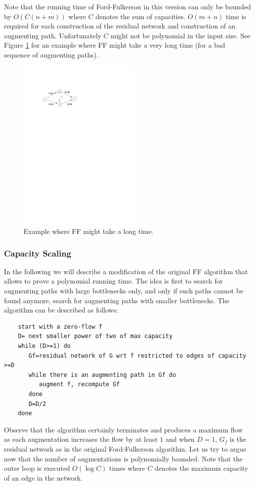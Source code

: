 \documentclass{article}
\begin{document}
Note that the running time of Ford-Fulkerson in this version can only be bounded by $O(C(n+m))$ where $C$ denotes the sum of capacities. $O(m+n)$ time is required for each construction of the residual network and construction of an augmenting path. Unfortunately $C$ might not be polynomial in the input size. See Figure \ref{FIG:FFbad} for an example where FF might take a very long time (for a bad sequence of augmenting paths).
\begin{figure}
\centering
\includegraphics[width=6cm]{Figs/FF-bad.pdf}
\caption{Example where FF might take a long time.}\label{FIG:FFbad}
\end{figure}


\subsubsection{Capacity Scaling}
In the following we will describe a modification of the original FF algorithm that allows to prove a polynomial running time. The idea is first to search for augmenting paths with large bottlenecks only, and only if such paths cannot be found anymore, search for augmenting paths with smaller bottlenecks. The algorithm can be described as follows:
\begin{verbatim}
	start with a zero-flow f
	D= next smaller power of two of max capacity
	while (D>=1) do
	   Gf=residual network of G wrt f restricted to edges of capacity >=D
	   while there is an augmenting path in Gf do
	      augment f, recompute Gf
	   done
	   D=D/2
	done
\end{verbatim}

Observe that the algorithm certainly terminates and produces a maximum flow as each augmentation increases the flow by at least $1$ and when $D=1$, $G_f$ is the residual network as in the original Ford-Fulkerson algorithm.
Let us try to argue now that the number of augmentations is polynomially bounded.
Note that the outer loop is executed $O(\log C)$ times where $C$ denotes the maximum capacity of an edge in the network.
\end{document}
